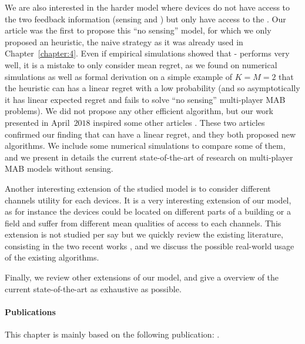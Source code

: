 We are also interested in the harder model where devices do not have access to the two feedback information (sensing and \Ack) but only have access to the \Ack.
Our article \cite{Besson2018ALT} was the first to propose this ``no sensing'' model, for which we only proposed an heuristic, the naive \Selfish{} strategy as it was already used in Chapter~\ref{chapter:4}.
Even if empirical simulations showed that \Selfish-\klUCB{} performs very well, it is a mistake to only consider mean regret, as we found on numerical simulations as well as formal derivation on a simple example of $K=M=2$ that the \Selfish{} heuristic can has a linear regret with a low probability (and so asymptotically it has linear expected regret and fails to solve ``no sensing'' multi-player MAB problems).
We did not propose any other efficient algorithm, but our work presented in April~$2018$ inspired some other articles \cite{LugosiMehrabian18,BoursierPerchet18}.
These two articles confirmed our finding that \Selfish{} can have a linear regret, and they both proposed new algorithms.
We include some numerical simulations to compare some of them, and we present in details the current state-of-the-art of research on multi-player MAB models without sensing.

Another interesting extension of the studied model is to consider different channels utility for each devices. It is a very interesting extension of our model, as for instance the devices could be located on different parts of a building or a field and suffer from different mean qualities of access to each channels.
This extension is not studied per say but we quickly review the existing literature, consisting in the two recent works \cite{Bistritz18,KaufmannAbbas19}, and we discuss the possible real-world usage of the existing algorithms.

Finally, we review other extensions of our model, and give a overview of the current state-of-the-art as exhaustive as possible.


\vfill{}

\paragraph{Publications}

This chapter is mainly based on the following publication: \cite{Besson2018ALT}.


\newpage
\graphicspath{{2-Chapters/5-Chapter/Images/}}
\graphicspath{{2-Chapters/5-Chapter/ALT_2018__MPBandits.git/figures/}}

